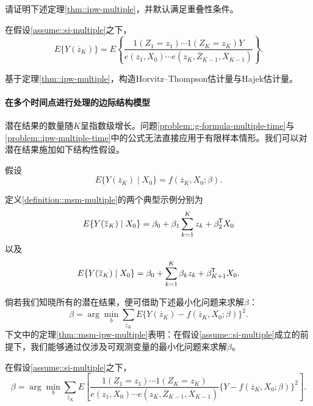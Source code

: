 请证明下述定理\ref{thm::ipw-multiple}，并默认满足重叠性条件。 


\begin{theorem}
[具有多个时间点的逆概率加权法]\label{thm::ipw-multiple}
在假设\ref{assume::si-multiple}之下，
$$
  E\{ Y(\overline{z}_K)  \}   = E\left\{  
  \frac{1(Z_1 = z_1) \cdots  1( Z_K = z_K) Y}{    e(z_1, X_0)  \cdots  e(z_K, \overline{Z}_{K-1},  \overline{X}_{K-1})   }
  \right\}.
$$
\end{theorem}


基于定理\ref{thm::ipw-multiple}，构造Horvitz–Thompson估计量与Hajek估计量。 


 \paragraph{在多个时间点进行处理的边际结构模型}\label{problem::msm-multiple-time}


潜在结果的数量随$K$呈指数级增长。问题\ref{problem::g-formula-multiple-time}与\ref{problem::ipw-multiple-time}中的公式无法直接应用于有限样本情形。我们可以对潜在结果施加如下结构性假设。


\begin{definition}
[包含多个时间点的边际结构模型]\label{definition::msm-multiple}
假设  
$$
  E\{ Y(\overline{z}_K)  \mid X_0\}  = f(\overline{z}_K, X_0 ; \beta  ).
$$
\end{definition}


定义\ref{definition::msm-multiple}的两个典型示例分别为
$$
  E\{ Y(\overline{z}_K)  \mid X_0\}   = \beta_0 + \beta_1 \sum_{k=1}^K z_k + \beta_2^{\mkern-1.5mu\mathsf{T}} X_0 
  $$
以及
$$ 
 E\{ Y(\overline{z}_K)  \mid X_0\}   = \beta_0 +  \sum_{k=1}^K \beta_k z_k + \beta_{K+1}^{\mkern-1.5mu\mathsf{T}} X_0 .
 $$

倘若我们知晓所有的潜在结果，便可借助下述最小化问题来求解$\beta$：
$$
\beta = \arg \min_b  \sum_{  \overline{z}_K  }  E\{   Y(\overline{z}_K) -  f(\overline{z}_K, X_0 ; \beta  )\}^2.
$$
下文中的定理\ref{thm::msm-ipw-multiple}表明：在假设\ref{assume::si-multiple}成立的前提下，我们能够通过仅涉及可观测变量的最小化问题来求解$\beta$。 


\begin{theorem}
[针对含多个时间点的边际结构模型的逆概率加权法]\label{thm::msm-ipw-multiple}
在假设\ref{assume::si-multiple}之下，
$$
\beta = \arg \min_b  \sum_{  \overline{z}_K  }    E\left[ 
  \frac{1(Z_1 = z_1) \cdots 1( Z_K = z_K) }{    e(z_1, X_0)  \cdots  e(z_K, \overline{Z}_{K-1},  \overline{X}_{K-1})    }
  \{ Y -  f(\overline{z}_K, X_0 ; \beta  )\} ^2
  \right] .
$$
\end{theorem}



